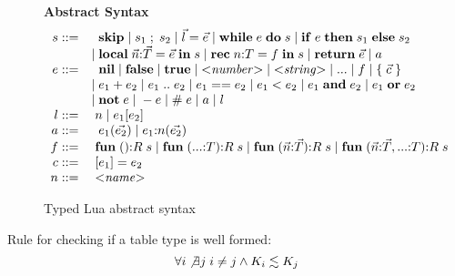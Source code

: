 \begin{figure}[!ht]
\textbf{Abstract Syntax}\\
\dstart
$$
\begin{array}{rl}
s ::= & \;\; \mathbf{skip} \; | \;
s_{1} \; ; \; s_{2} \; | \;
\vec{l} = \vec{e}  \; | \;
\mathbf{while} \; e \; \mathbf{do} \; s \; | \;
\mathbf{if} \; e \; \mathbf{then} \; s_{1} \; \mathbf{else} \; s_{2}\\
& | \; \mathbf{local} \; \vec{n}{:}\vec{T} = \vec{e} \; \mathbf{in} \; s \; | \;
\mathbf{rec} \; n{:}T = f \; \mathbf{in} \; s \; | \;
\mathbf{return} \; \vec{e} \; | \;
a\\
e ::= & \;\; \mathbf{nil} \; | \;
\mathbf{false} \; | \;
\mathbf{true} \; | \;
{<}{\it number}{>} \; | \;
{<}{\it string}{>} \; | \;
{...} \; | \;
f \; | \;
\{ \; \vec{c}\; \} \\
& | \; e_{1} + e_{2} \; | \;
e_{1} \; {..} \; e_{2} \; | \;
e_{1} == e_{2} \; | \;
e_{1} < e_{2} \; | \;
e_{1} \; \mathbf{and} \; e_{2} \; | \;
e_{1} \; \mathbf{or} \; e_{2} \\
& | \; \mathbf{not} \; e \; | \;
- e \; | \;
\# \; e \; | \;
a \; | \;
l \\
l ::= & \; n \; | \;
e_{1}[e_{2}]\\
a ::= & \;\; e_{1}(\vec{e_{2}}) \; | \;
e_{1}{:}n(\vec{e_{2}})\\
f ::= & \; \mathbf{fun} \; (){:}R \; s \; | \;
\mathbf{fun} \; ({...}{:}T){:}R \; s \; | \;
\mathbf{fun} \; (\vec{n}{:}\vec{T}){:}R \; s \; | \;
\mathbf{fun} \; (\vec{n}{:}\vec{T},{...}{:}T){:}R \; s\\
c ::= & \; [e_{1}] = e_{2}\\
n ::= & \; {<}{\it name}{>}\\
\end{array}
$$
\dend
\caption{Typed Lua abstract syntax}
\label{fig:syntax}
\end{figure}

Rule for checking if a table type is well formed:
\[
\forall i \not\exists j \; i \not= j \wedge K_{i} \lesssim K_{j}
\]

